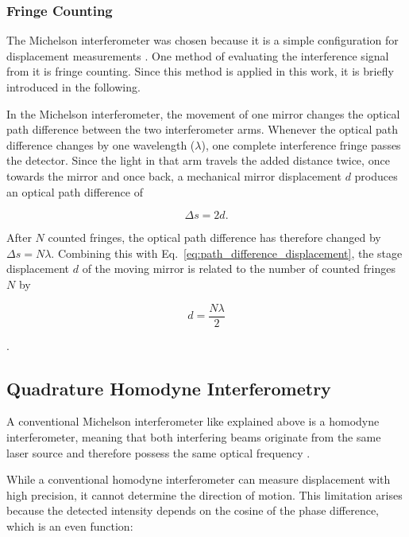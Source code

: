 \subsubsection{Fringe Counting}

The Michelson interferometer was chosen because it is a simple configuration for displacement measurements . One method of evaluating the interference signal from it is fringe counting. Since this method is applied in this work, it is briefly introduced in the following.

In the Michelson interferometer, the movement of one mirror changes the optical path difference between the two interferometer arms. Whenever the optical path difference changes by one wavelength (\(\lambda\)), one complete interference fringe passes the detector. Since the light in that arm travels the added distance twice, once towards the mirror and once back, a mechanical mirror displacement \(d\) produces an optical path difference of

\begin{equation}
\Delta s = 2d.
\label{eq:path_difference_displacement}
\end{equation}

After \(N\) counted fringes, the optical path difference has therefore changed by \(\Delta s = N\lambda\). Combining this with Eq.~\eqref{eq:path_difference_displacement}, the stage displacement \(d\) of the moving mirror is related to the number of counted fringes \(N\) by

\begin{equation}
d = \frac{N\lambda}{2}
\end{equation}

.

\subsection{Quadrature Homodyne Interferometry}

A conventional Michelson interferometer like explained above is a homodyne interferometer, meaning that both interfering beams originate from the same laser source and therefore possess the same optical frequency .

While a conventional homodyne interferometer can measure displacement with high precision, it cannot determine the direction of motion. This limitation arises because the detected intensity depends on the cosine of the phase difference, which is an even function:

